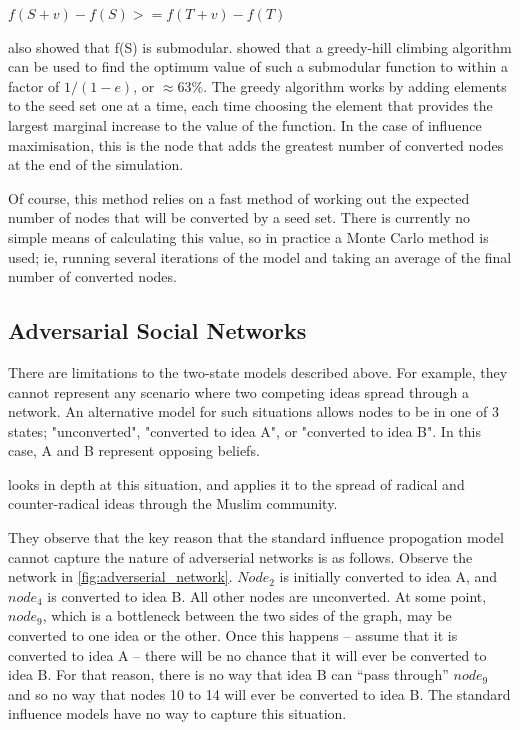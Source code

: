 \(f(S+v) - f(S) >= f(T+v) - f(T)\)

\cite{kempe} also showed that f(S) is submodular. \cite{nem} showed that a greedy-hill climbing algorithm can be used to find the optimum value of such a submodular function to within a factor of \(1/(1-e)\), or \(\approx 63\%\). The greedy algorithm works by adding elements to the seed set one at a time, each time choosing the element that provides the largest marginal increase to the value of the function. In the case of influence maximisation, this is the node that adds the greatest number of converted nodes at the end of the simulation.

Of course, this method relies on a fast method of working out the expected number of nodes that will be converted by a seed set. There is currently no simple means of calculating this value, so in practice a Monte Carlo method is used; ie, running several iterations of the model and taking an average of the final number of converted nodes.

\subsection{Adversarial Social Networks}

 There are limitations to the two-state models described above. For example, they cannot represent any scenario where two competing ideas spread through a network. An alternative model for such situations allows nodes to be in one of 3 states; "unconverted", "converted to idea A", or "converted to idea B". In this case, A and B represent opposing beliefs.

\cite{muslims} looks in depth at this situation, and applies it to the spread of radical and counter-radical ideas through the Muslim community.

They observe that the key reason that the standard influence propogation model cannot capture the nature of adverserial networks is as follows. Observe the network in \ref{fig:adverserial_network}. \(Node_2\) is initially converted to idea A, and \(node_4\) is converted to idea B. All other nodes are unconverted. At some point, \(node_9\), which is a bottleneck between the two sides of the graph, may be converted to one idea or the other. Once this happens -- assume that it is converted to idea A -- there will be no chance that it will ever be converted to idea B. For that reason, there is no way that idea B can ``pass through'' \(node_9\) and so no way that nodes 10 to 14 will ever be converted to idea B. The standard influence models have no way to capture this situation.

